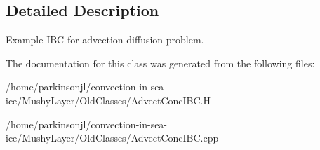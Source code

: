 \subsection{Detailed Description}
Example I\-B\-C for advection-\/diffusion problem. 

The documentation for this class was generated from the following files\-:\begin{DoxyCompactItemize}
\item 
/home/parkinsonjl/convection-\/in-\/sea-\/ice/\-Mushy\-Layer/\-Old\-Classes/Advect\-Conc\-I\-B\-C.\-H\item 
/home/parkinsonjl/convection-\/in-\/sea-\/ice/\-Mushy\-Layer/\-Old\-Classes/Advect\-Conc\-I\-B\-C.\-cpp\end{DoxyCompactItemize}
